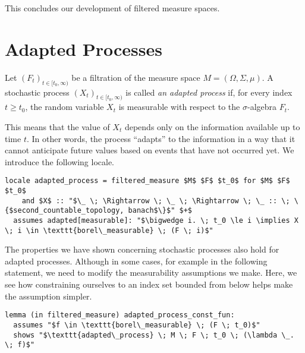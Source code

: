 This concludes our development of filtered measure spaces.

\section{Adapted Processes}

\begin{definition}

Let $(F_t)_{t \in [t_0, \infty)}$ be a filtration of the measure space $M = (\Omega, \Sigma, \mu)$. A stochastic process $(X_t)_{t \in [t_0, \infty)}$ is called \textit{an adapted process} if, for every index $t \ge t_0$, the random variable $X_t$ is measurable with respect to the $\sigma$-algebra $F_t$.

\end{definition}

This means that the value of $X_t$ depends only on the information available up to time $t$. In other words, the process ``adapts'' to the information in a way that it cannot anticipate future values based on events that have not occurred yet. We introduce the following locale.

\begin{isalemma}
{\small
\begin{lstlisting}[style=isabelle]
locale adapted_process = filtered_measure $M$ $F$ $t_0$ for $M$ $F$ $t_0$ 
	and $X$ :: "$\_ \; \Rightarrow \; \_ \; \Rightarrow \; \_ :: \; \{$second_countable_topology, banach$\}$" $+$
  assumes adapted[measurable]: "$\bigwedge i. \; t_0 \le i \implies X \; i \in \texttt{borel\_measurable} \; (F \; i)$"
\end{lstlisting}
}
\end{isalemma}

The properties we have shown concerning stochastic processes also hold for adapted processes. Although in some cases, for example in the following statement, we need to modify the measurability assumptions we make. Here, we see how constraining ourselves to an index set bounded from below helps make the assumption simpler.

\begin{isalemma}
{\small
\begin{lstlisting}[style=isabelle]
lemma (in filtered_measure) adapted_process_const_fun:
  assumes "$f \in \texttt{borel\_measurable} \; (F \; t_0)$"
  shows "$\texttt{adapted\_process} \; M \; F \; t_0 \; (\lambda \_. \; f)$"
\end{lstlisting}
}
\end{isalemma}

